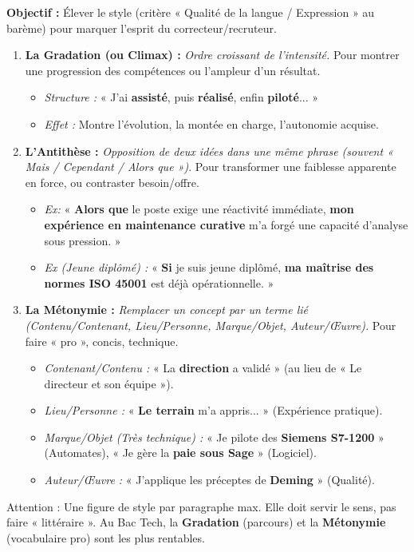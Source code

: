 \documentclass[11pt]{article}
\newcommand{\cle}[1]{{\popxbold\color{popdark}#1}}
\begin{document}
\begin{methode}
\textbf{Objectif :} Élever le style (critère « Qualité de la langue / Expression » au barème) pour marquer l'esprit du correcteur/recruteur.
\medskip
\begin{enumerate}
\item \textbf{La Gradation (ou Climax) :} \textit{Ordre croissant de l'intensité.} Pour montrer une progression des compétences ou l'ampleur d'un résultat.
\begin{itemize}
\item \textit{Structure :} « J'ai \textbf{assisté}, puis \textbf{réalisé}, enfin \textbf{piloté}... »
\item \textit{Effet :} Montre l'évolution, la montée en charge, l'autonomie acquise.
\end{itemize}
\item \textbf{L'Antithèse :} \textit{Opposition de deux idées dans une même phrase (souvent « Mais / Cependant / Alors que »)}. Pour transformer une faiblesse apparente en force, ou contraster besoin/offre.
\begin{itemize}
\item \textit{Ex:} « \textbf{Alors que} le poste exige une réactivité immédiate, \textbf{mon expérience en maintenance curative} m'a forgé une capacité d'analyse sous pression. »
\item \textit{Ex (Jeune diplômé) :} « \textbf{Si} je suis jeune diplômé, \textbf{ma maîtrise des normes ISO 45001} est déjà opérationnelle. »
\end{itemize}
\item \textbf{La Métonymie :} \textit{Remplacer un concept par un terme lié (Contenu/Contenant, Lieu/Personne, Marque/Objet, Auteur/Œuvre).} Pour faire « pro », concis, technique.
\begin{itemize}
\item \textit{Contenant/Contenu :} « La \textbf{direction} a validé » (au lieu de « Le directeur et son équipe »).
\item \textit{Lieu/Personne :} « \textbf{Le terrain} m'a appris... » (Expérience pratique).
\item \textit{Marque/Objet (Très technique) :} « Je pilote des \textbf{Siemens S7-1200} » (Automates), « Je gère la \textbf{paie sous Sage} » (Logiciel).
\item \textit{Auteur/Œuvre :} « J'applique les préceptes de \textbf{Deming} » (Qualité).
\end{itemize}
\end{enumerate}
\cle{Attention :} Une figure de style par paragraphe max. Elle doit servir le sens, pas faire « littéraire ». Au Bac Tech, la \textbf{Gradation} (parcours) et la \textbf{Métonymie} (vocabulaire pro) sont les plus rentables.
\end{methode}
\end{document}
